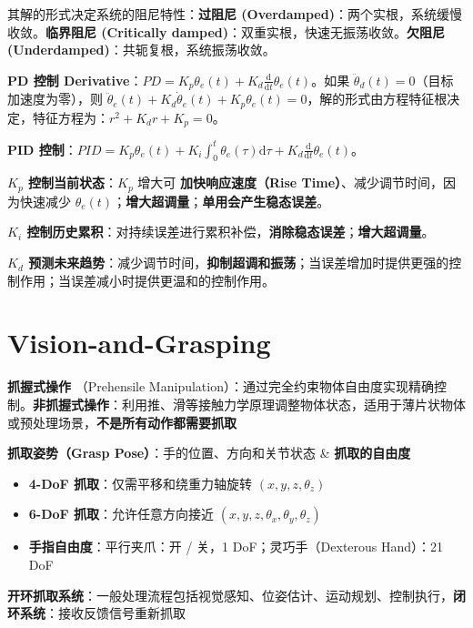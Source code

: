 \documentclass[
  8pt]{extarticle}
\providecommand{\tightlist}{%
  \setlength{\itemsep}{0pt}\setlength{\parskip}{0pt}}
\begin{document}
\begin{multicols*}{4}
其解的形式决定系统的阻尼特性：\textbf{过阻尼
(Overdamped)}：两个实根，系统缓慢收敛。\textbf{临界阻尼 (Critically
damped)}：双重实根，快速无振荡收敛。\textbf{欠阻尼
(Underdamped)}：共轭复根，系统振荡收敛。

\textbf{PD 控制
Derivative}：\(PD = K_p \theta_e(t) + K_d \frac{\mathrm{d}}{\mathrm{d}t}\theta_e(t)\)。如果
\(\ddot{\theta}_d(t) = 0\)（目标加速度为零），则
\(\ddot{\theta}_e(t) + K_d \dot{\theta}_e(t) + K_p \theta_e(t) = 0\)，解的形式由方程特征根决定，特征方程为：\(r^2 + K_d r + K_p = 0\)。

\textbf{PID
控制}：\(PID = K_p \theta_e(t) + K_i \int_0^t \theta_e(\tau)\mathrm{d}\tau + K_d \frac{\mathrm{d}}{\mathrm{d}t}\theta_e(t)\)。

\textbf{\(K_p\) 控制当前状态}：\(K_p\) 增大可 \textbf{加快响应速度（Rise
Time）}、减少调节时间，因为快速减少
\(\theta_e(t)\)；\textbf{增大超调量}；\textbf{单用会产生稳态误差}。

\textbf{\(K_i\)
控制历史累积}：对持续误差进行累积补偿，\textbf{消除稳态误差}；\textbf{增大超调量}。

\textbf{\(K_d\)
预测未来趋势}：减少调节时间，\textbf{抑制超调和振荡}；当误差增加时提供更强的控制作用；当误差减小时提供更温和的控制作用。

\hypertarget{vision-and-grasping}{%
\section{Vision-and-Grasping}\label{vision-and-grasping}}

\textbf{抓握式操作} （Prehensile
Manipulation）：通过完全约束物体自由度实现精确控制。\textbf{非抓握式操作}：利用推、滑等接触力学原理调整物体状态，适用于薄片状物体或预处理场景，\textbf{不是所有动作都需要抓取}

\textbf{抓取姿势（Grasp Pose）}：手的位置、方向和关节状态 \&
\textbf{抓取的自由度}

\begin{itemize}
\tightlist
\item
  \textbf{4-DoF 抓取}：仅需平移和绕重力轴旋转 \((x, y, z, \theta_z)\)
\item
  \textbf{6-DoF 抓取}：允许任意方向接近
  \((x, y, z, \theta_x, \theta_y, \theta_z)\)
\item
  \textbf{手指自由度}：平行夹爪：开 / 关，1 DoF；灵巧手（Dexterous
  Hand）：21 DoF
\end{itemize}

\textbf{开环抓取系统}：一般处理流程包括视觉感知、位姿估计、运动规划、控制执行，\textbf{闭环系统}：接收反馈信号重新抓取


\end{multicols*}
\end{document}
